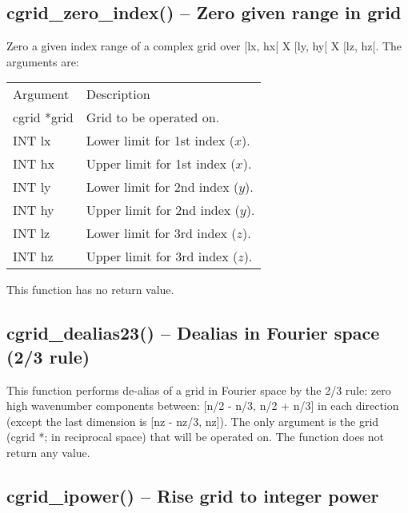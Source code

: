 \documentclass[12pt,letterpaper]{report}
\begin{document}
\subsection{cgrid\_zero\_index() -- Zero given range in grid}

Zero a given index range of a complex grid over [lx, hx[ X [ly, hy[ X [lz, hz[. The arguments are:
\begin{longtable}{p{} p{}}
Argument & Description\\
\cline{1-2}
cgrid *grid & Grid to be operated on.\\                                                                           
INT lx & Lower limit for 1st index ($x$).\\                                                                                     
INT hx & Upper limit for 1st index ($x$).\\                                                                                     
INT ly & Lower limit for 2nd index ($y$).\\                                                                                     
INT hy & Upper limit for 2nd index ($y$).\\                                                                                     
INT lz & Lower limit for 3rd index ($z$).\\                                                                                      INT hz & Upper limit for 3rd index ($z$).\\        
\end{longtable}
\noindent
This function has no return value.

\subsection{cgrid\_dealias23() -- Dealias in Fourier space (2/3 rule)}

This function performs de-alias of a grid in Fourier space by the 2/3 rule: zero high wavenumber components between: [n/2 - n/3, n/2 + n/3] in each direction (except the last dimension is [nz - nz/3, nz]). The only argument is the grid (cgrid *; in reciprocal space) that will be operated on. The function does not return any value.

\subsection{cgrid\_ipower() -- Rise grid to integer power}
\end{document}

